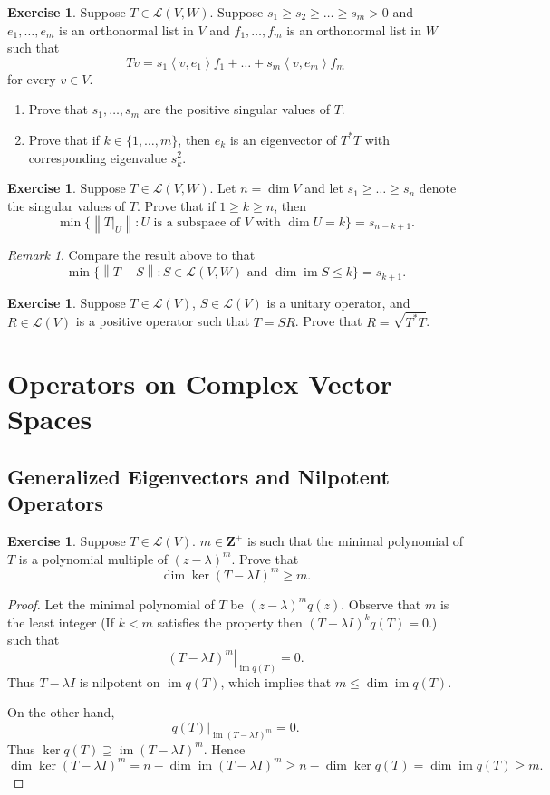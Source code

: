 \documentclass[nofonts,colorlinks]{tufte-handout}
\theoremstyle{plain} %
\theoremstyle{definition}
\newtheorem{exer}[thm]{Exercise}
\theoremstyle{remark}
\newtheorem{rmk}[thm]{Remark}
\newcommand{\norm}[1]{\mathopen{}\left\lVert#1\right\rVert}
\newcommand{\inp}[2]{\mathopen{}\left\langle#1,#2\right\rangle}
\newcommand{\rest}[2]{\mathopen{}\left.#1\right|_{#2}}
\newcommand{\Z}{\mathbf{Z}}
\renewcommand{\L}{\mathcal{L}}
\DeclareMathOperator{\im}{im}
\begin{document}
\begin{exer}
	Suppose $T\in\L(V,W)$. Suppose $s_1\geq s_2\geq\dots\geq s_m>0$ and $e_1,\dots,e_m$ is an orthonormal list in $V$ and $f_1,\dots,f_m$ is an orthonormal list in $W$ such that
	\[Tv=s_1\inp{v}{e_1}f_1+\dots+s_m\inp{v}{e_m}f_m\]
	for every $v\in V$.
	\begin{enumerate}
		\item Prove that $s_1,\dots,s_m$ are the positive singular values of $T$.
		\item Prove that if $k\in\{1,\dots,m\}$, then $e_k$ is an eigenvector of $T^*T$ with corresponding eigenvalue $s_k^2$.
	\end{enumerate}
\end{exer}

\begin{exer}
	Suppose $T\in\L(V,W)$. Let $n=\dim V$ and let $s_1\geq\dots\geq s_n$ denote the singular values of $T$. Prove that if $1\geq k\geq n$, then
	\[\min\{\norm{\rest{T}{U}}:U\text{ is a subspace of $V$ with $\dim U=k$}\}=s_{n-k+1}.\]
\end{exer}
\begin{rmk}
	Compare the result above to that
	\[\min\{\norm{T-S}:S\in\L(V,W)\text{ and $\dim\im S\leq k$}\}=s_{k+1}.\]
\end{rmk}

\begin{exer}
	Suppose $T\in\L(V)$, $S\in\L(V)$ is a unitary operator, and $R\in\L(V)$ is a positive operator such that $T=SR$. Prove that $R=\sqrt{T^*T}$.
\end{exer}


\section{Operators on Complex Vector Spaces}
\subsection{Generalized Eigenvectors and Nilpotent Operators}
\begin{exer}
	Suppose $T\in\L(V)$. $m\in\Z^+$ is such that the minimal polynomial of $T$ is a polynomial multiple of $(z-\lambda)^m$. Prove that
	\[\dim\ker(T-\lambda I)^m\geq m.\]
\end{exer}
\begin{proof}
	Let the minimal polynomial of $T$ be $(z-\lambda)^mq(z)$. Observe that $m$ is the least integer (If $k<m$ satisfies the property then $(T-\lambda I)^kq(T)=0$.) such that
	\[\rest{(T-\lambda I)^m}{\im q(T)}=0.\]
	Thus $T-\lambda I$ is nilpotent on $\im q(T)$, which implies that $m\leq\dim\im q(T)$.

	On the other hand,
	\[\rest{q(T)}{\im(T-\lambda I)^m}=0.\]
	Thus $\ker q(T)\supseteq\im(T-\lambda I)^m$. Hence
	\[\dim\ker(T-\lambda I)^m=n-\dim\im(T-\lambda I)^m\geq n-\dim\ker q(T)=\dim\im q(T)\geq m.\]
\end{proof}
\end{document}

